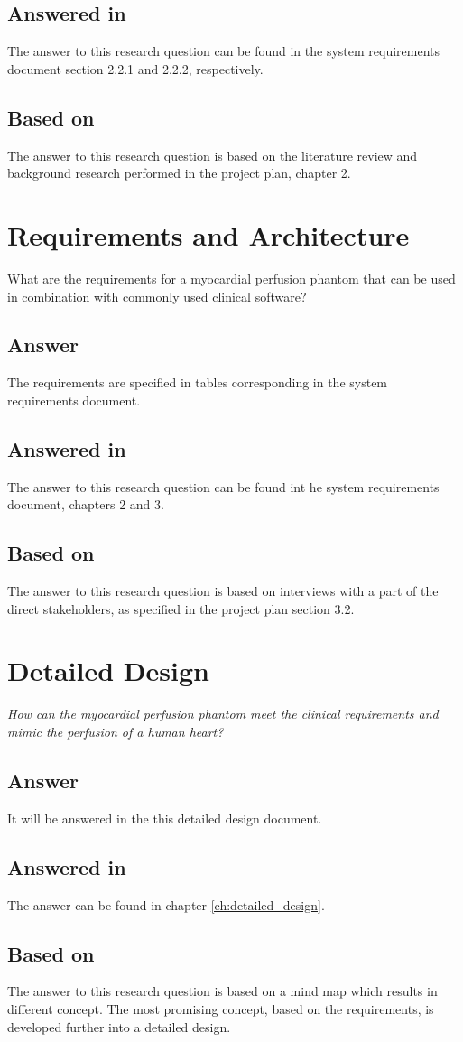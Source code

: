 \subsection*{Answered in}
The answer to this research question can be found in the system requirements document section 2.2.1 and 2.2.2, respectively.
\subsection*{Based on}
The answer to this research question is based on the literature review and background research performed in the project plan, chapter 2.
\section{Requirements and Architecture}
What are the requirements for a myocardial perfusion phantom that can be used in combination with commonly used clinical software?
\subsection*{Answer} 
The requirements are specified in tables corresponding in the system requirements document.
\subsection*{Answered in}
The answer to this research question can be found int he system requirements document, chapters 2  and 3.
\subsection*{Based on}
The answer to this research question is based on interviews with a part of the direct stakeholders, as specified in the project plan section 3.2.
\section{Detailed Design}
\textit{How can the myocardial perfusion phantom meet the clinical requirements and mimic the perfusion of a human heart?}
\subsection*{Answer}
It will be answered in the this detailed design document.
\subsection*{Answered in}
The answer can be found in chapter \ref{ch:detailed_design}.
\subsection*{Based on}
The answer to this research question is based on a mind map which results in different concept. The most promising concept, based on the requirements, is developed further into a detailed design. 
